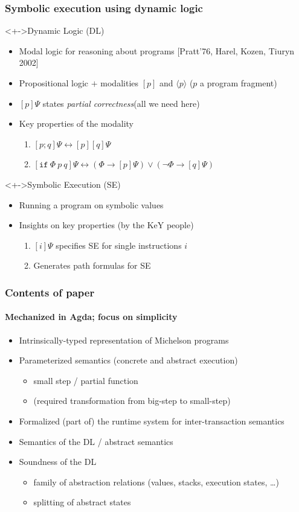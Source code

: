 \documentclass[aspectratio=1610]{beamer}
\begin{document}
\begin{frame}
  \frametitle{Symbolic execution using dynamic logic}
  \begin{block}<+->{Dynamic Logic (DL)}
  \begin{itemize}
  \item Modal logic for reasoning about programs [Pratt'76, Harel, Kozen, Tiuryn 2002]
  \item Propositional logic $+$ modalities $[p]$ and $\langle p\rangle$ \hfill ($p$ a program fragment)
  \item $[p]\Psi$ states \emph{partial correctness}\hfill (all we need here)
  \item Key properties of the modality
    \begin{enumerate}
    \item $[p;q]\Psi \leftrightarrow [p][q]\Psi$
    \item $[\mathtt{if}~\Phi~p~q]\Psi \leftrightarrow (\Phi \to [p]\Psi) \vee (\neg\Phi \to [q]\Psi)$
  \end{enumerate}
  \end{itemize}
\end{block}
\begin{block}<+->{Symbolic Execution (SE)}
  \begin{itemize}
  \item Running a program on symbolic values
  \item Insights on key properties (by the KeY people)
    \begin{enumerate}
    \item $[i]\Psi$ specifies SE for single instructions $i$
    \item Generates path formulas for SE
  \end{enumerate}
  \end{itemize}
\end{block}
\end{frame}
\begin{frame}
  \frametitle{Contents of paper}
  \framesubtitle{Mechanized in Agda; focus on simplicity}
  \begin{itemize}
  \item Intrinsically-typed representation of Michelson programs
  \item Parameterized semantics (concrete and abstract execution)
    \begin{itemize}
    \item small step / partial function
    \item (required transformation from big-step to small-step)
    \end{itemize}
  \item Formalized (part of) the runtime system for inter-transaction semantics
  \item Semantics of the DL / abstract semantics
  \item Soundness of the DL
    \begin{itemize}
    \item family of abstraction relations (values, stacks, execution states, \dots)
    \item splitting of abstract states
  \end{itemize}
  \end{itemize}
\end{frame}
\end{document}
